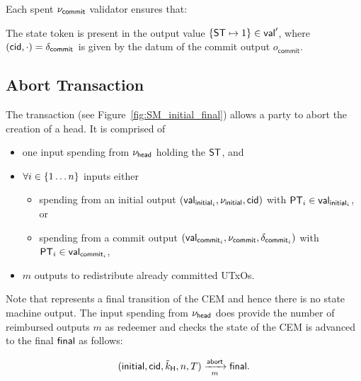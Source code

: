 \noindent Each spent $\nu_{\mathsf{commit}}$ validator ensures that:
\begin{menumerate}
  \item The state token is present in the output value
  $\{\mathsf{ST} \mapsto 1\} \in \mathsf{val}'$, where $(\mathsf{cid},\cdot) = \delta_{\mathsf{commit}_{}}$ is given
  by the datum of the commit output $o_{\mathsf{commit}}$.
\end{menumerate}



\subsection{Abort Transaction}\label{sec:abort-tx}



The \mtxAbort{} transaction (see Figure~\ref{fig:SM_initial_final}) allows a
party to abort the creation of a head. It is comprised of
\begin{itemize}
  \item one input spending from $\nu_\mathsf{head}$ holding the $\mathsf{ST}$, and
  \item $\forall i \in \{1 \dots n\}$ inputs either
    \begin{itemize}
      \item spending from an initial output $(\mathsf{val}_{\mathsf{initial}_{i}}, \nu_{\mathsf{initial}}, \mathsf{cid})$ with $\mathsf{PT}_{i} \in \mathsf{val}_{\mathsf{initial}_{i}}$, or
      \item spending from a commit output $(\mathsf{val}_{\mathsf{commit}_{i}}, \nu_{\mathsf{commit}}, \delta_{\mathsf{commit}_{i}})$ with $\mathsf{PT}_{i} \in \mathsf{val}_{\mathsf{commit}_{i}}$,
    \end{itemize}
  \item $m$ outputs to redistribute already committed UTxOs.
\end{itemize}
Note that \mtxAbort{} represents a final transition of the CEM and hence there
is no state machine output. The input spending from $\nu_\mathsf{head}$ does provide the
number of reimbursed outputs $m$ as redeemer  and checks the state of the CEM is
advanced to the final $\mathsf{final}$ as follows:

\[
   (\mathsf{initial},\mathsf{cid},\tilde{k}_{\mathsf{H}},n,T) \xrightarrow[m]{\mathsf{abort}} \mathsf{final}.
\]

